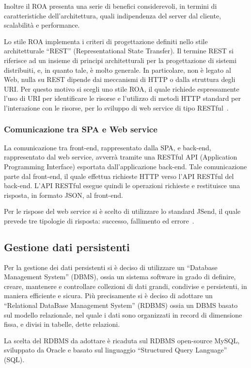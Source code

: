 Inoltre il ROA presenta una serie di benefici considerevoli, in termini di caratteristiche dell'architettura, quali indipendenza del server dal cliente, scalabilit\`a e performance.

Lo stile ROA implementa i criteri di progettazione definiti nello stile architetturale ``REST'' (Representational State Transfer). Il termine REST  si riferisce ad un insieme di principi architetturali per la progettazione di sistemi distribuiti, e, in quanto tale, \`e molto generale. In particolare, non \`e legato al Web, nulla su REST dipende dai meccanismi di HTTP o dalla struttura degli URI. Per questo motivo si scegli uno stile ROA, il quale richiede espressamente l'uso di URI per identificare le risorse e l'utilizzo di metodi HTTP standard per l'interazione con le risorse, per lo sviluppo di web service di tipo RESTful~\cite{RichardsonRuby}. 

\subsubsection{Comunicazione tra SPA e Web service}
La comunicazione tra front-end, rappresentato dalla SPA, e back-end, rappresentato dal web service, avverr\`a tramite una RESTful API (Application Programming Interface) esportata dall'applicazione back-end. Tale comunicazione parte dal front-end, il quale effettua richieste HTTP verso l'API RESTful del back-end. L'API RESTful esegue quindi le operazioni richieste e restituisce una risposta, in formato JSON, al front-end.

Per le rispose del web service si \`e scelto di utilizzare lo standard JSend, il quale prevede tre tipologie di risposta: successo, fallimento ed errore~\cite{JSend}.

\subsection{Gestione dati persistenti}
Per la gestione dei dati persistenti si \`e deciso di utilizzare un ``Database Management System'' (DBMS), ossia un sistema software in grado di definire, creare, mantenere e controllare collezioni di dati grandi, condivise e persistenti, in maniera efficiente e sicura. Pi\`u precisamente si \`e deciso di adottare un ``Relational DataBase Management System'' (RDBMS) ossia un DBMS basato sul modello relazionale, nel quale i dati sono organizzati in record di dimensione fissa, e divisi in tabelle, dette relazioni.

La scelta del RDBMS da adottare \`e ricaduta sul RDBMS open-source MySQL, sviluppato da Oracle e basato sul linguaggio ``Structured Query Language'' (SQL).
